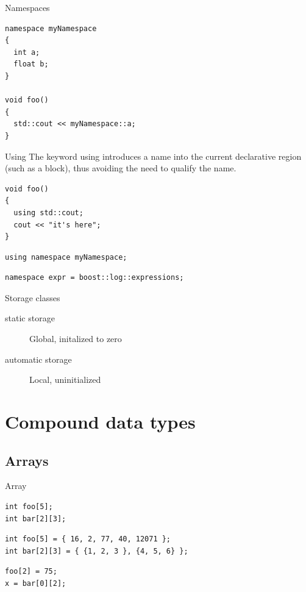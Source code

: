 \documentclass{beamer}
\begin{document}
\begin{frame}[fragile]{Namespaces}
\begin{lstlisting}[caption=Namespace]
namespace myNamespace
{
  int a;
  float b;
}

void foo()
{
  std::cout << myNamespace::a;
}
\end{lstlisting}
\end{frame}

\begin{frame}[fragile]{Using}
The keyword using introduces a name into the current declarative region (such as
a block), thus avoiding the need to qualify the name.
\begin{lstlisting}[caption=using]
void foo()
{
  using std::cout;
  cout << "it's here";
}
\end{lstlisting}
\begin{lstlisting}[caption=using namespace]
using namespace myNamespace;
\end{lstlisting}

\begin{lstlisting}[caption=namespace alias]
namespace expr = boost::log::expressions;
\end{lstlisting}

\end{frame}

\begin{frame}{Storage classes}
\begin{description}
\item[static storage] Global, initalized to zero
\item[automatic storage] Local, uninitialized
\end{description}
\end{frame}

\section{Compound data types}
\subsection{Arrays}
\begin{frame}[fragile]{Array}
\begin{lstlisting}[caption=Array declaration]
int foo[5];
int bar[2][3];
\end{lstlisting}

\begin{lstlisting}[caption=Array initalisation]
int foo[5] = { 16, 2, 77, 40, 12071 };
int bar[2][3] = { {1, 2, 3 }, {4, 5, 6} };
\end{lstlisting}

\begin{lstlisting}[caption=Array access]
foo[2] = 75;
x = bar[0][2];
\end{lstlisting}
\end{frame}
\end{document}
